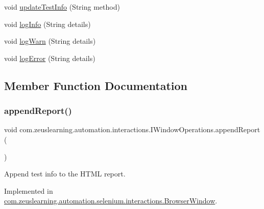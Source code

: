\begin{DoxyCompactItemize}
\item 
void \hyperlink{interfacecom_1_1zeuslearning_1_1automation_1_1interactions_1_1IWindowOperations_aa9d371c94ab4c3ba4c1d9cdca0fc4532}{update\+Test\+Info} (String method)
\item 
void \hyperlink{interfacecom_1_1zeuslearning_1_1automation_1_1interactions_1_1IWindowOperations_ab8dcfa34ce29883587eed3fcc9ca83fd}{log\+Info} (String details)
\item 
void \hyperlink{interfacecom_1_1zeuslearning_1_1automation_1_1interactions_1_1IWindowOperations_a8cb651e4ad3d55ef3ce0eeef34680a5a}{log\+Warn} (String details)
\item 
void \hyperlink{interfacecom_1_1zeuslearning_1_1automation_1_1interactions_1_1IWindowOperations_ac2c4ec2b0ed8f6d50d24786e859f9315}{log\+Error} (String details)
\end{DoxyCompactItemize}


\subsection{Member Function Documentation}
\hypertarget{interfacecom_1_1zeuslearning_1_1automation_1_1interactions_1_1IWindowOperations_a86e4c8b3c5bad66a1b9d7a2bf15765c8}{}\label{interfacecom_1_1zeuslearning_1_1automation_1_1interactions_1_1IWindowOperations_a86e4c8b3c5bad66a1b9d7a2bf15765c8} 
\subsubsection{\texorpdfstring{append\+Report()}{appendReport()}}
{\footnotesize\ttfamily void com.\+zeuslearning.\+automation.\+interactions.\+I\+Window\+Operations.\+append\+Report (\begin{DoxyParamCaption}{ }\end{DoxyParamCaption})}

Append test info to the H\+T\+ML report. 

Implemented in \hyperlink{classcom_1_1zeuslearning_1_1automation_1_1selenium_1_1interactions_1_1BrowserWindow_a2a3afd6b5229d2bfaecbccd92b8a4fe9}{com.\+zeuslearning.\+automation.\+selenium.\+interactions.\+Browser\+Window}.

